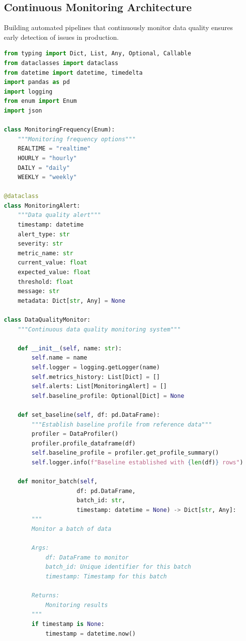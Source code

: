 \subsection{Continuous Monitoring Architecture}

Building automated pipelines that continuously monitor data quality ensures early detection of issues in production.

\begin{lstlisting}[language=Python, caption=Automated Data Quality Monitoring Pipeline]
from typing import Dict, List, Any, Optional, Callable
from dataclasses import dataclass
from datetime import datetime, timedelta
import pandas as pd
import logging
from enum import Enum
import json

class MonitoringFrequency(Enum):
    """Monitoring frequency options"""
    REALTIME = "realtime"
    HOURLY = "hourly"
    DAILY = "daily"
    WEEKLY = "weekly"

@dataclass
class MonitoringAlert:
    """Data quality alert"""
    timestamp: datetime
    alert_type: str
    severity: str
    metric_name: str
    current_value: float
    expected_value: float
    threshold: float
    message: str
    metadata: Dict[str, Any] = None

class DataQualityMonitor:
    """Continuous data quality monitoring system"""

    def __init__(self, name: str):
        self.name = name
        self.logger = logging.getLogger(name)
        self.metrics_history: List[Dict] = []
        self.alerts: List[MonitoringAlert] = []
        self.baseline_profile: Optional[Dict] = None

    def set_baseline(self, df: pd.DataFrame):
        """Establish baseline profile from reference data"""
        profiler = DataProfiler()
        profiler.profile_dataframe(df)
        self.baseline_profile = profiler.get_profile_summary()
        self.logger.info(f"Baseline established with {len(df)} rows")

    def monitor_batch(self,
                     df: pd.DataFrame,
                     batch_id: str,
                     timestamp: datetime = None) -> Dict[str, Any]:
        """
        Monitor a batch of data

        Args:
            df: DataFrame to monitor
            batch_id: Unique identifier for this batch
            timestamp: Timestamp for this batch

        Returns:
            Monitoring results
        """
        if timestamp is None:
            timestamp = datetime.now()


\end{lstlisting}
